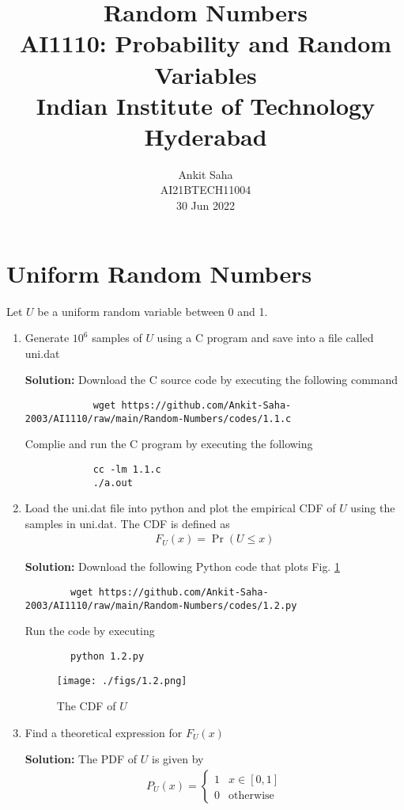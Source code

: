 \documentclass[journal,12pt,twocolumn]{IEEEtran}
\title{Random Numbers \\ \Large AI1110: Probability and Random Variables \\ \large Indian Institute of Technology Hyderabad}
\author{Ankit Saha \\ \normalsize AI21BTECH11004 \\ \vspace*{20pt} \normalsize  30 Jun 2022}
\newcommand{\solution}{\noindent \textbf{Solution: }}
\providecommand{\pr}[1]{\ensuremath{\Pr\left(#1\right)}}
\numberwithin{equation}{section}
\begin{document}
	\maketitle
	
	\section{Uniform Random Numbers}
	Let $U$ be a uniform random variable between 0 and 1.
	\begin{enumerate}[label=\thesection.\arabic*,ref=\thesection.\theenumi]
	\item Generate $10^6$ samples of $U$ using a C program and save into a file called uni.dat

		\solution Download the C source code by executing the following command
		\begin{lstlisting}
			wget https://github.com/Ankit-Saha-2003/AI1110/raw/main/Random-Numbers/codes/1.1.c
		\end{lstlisting}
		Complie and run the C program by executing the following
		\begin{lstlisting}
			cc -lm 1.1.c
			./a.out
		\end{lstlisting}
	
	\item Load the uni.dat file into python and plot the empirical CDF of $U$ using the samples in uni.dat. The CDF is defined as
	\begin{align}
		F_{U}(x) = \pr{U \le x}
	\end{align}

	\solution  Download the following Python code that plots Fig. \ref{fig-1.2}
	\begin{lstlisting}
		wget https://github.com/Ankit-Saha-2003/AI1110/raw/main/Random-Numbers/codes/1.2.py
	\end{lstlisting}
	Run the code by executing
	\begin{lstlisting}
		python 1.2.py
	\end{lstlisting}
	\begin{figure}
		\centering
		\texttt{[image: ./figs/1.2.png]}
		\caption{The CDF of $U$}
		\label{fig-1.2}
	\end{figure}
	
	\item Find a  theoretical expression for $F_{U}(x)$
	
	\solution The PDF of $U$ is given by
	\begin{align}
		P_{U}(x) = 
		\begin{cases}
			1 & x \in [0, 1] \\
			0 & \text{otherwise}
		\end{cases}
	\end{align}
	

\end{enumerate}
\end{document}
